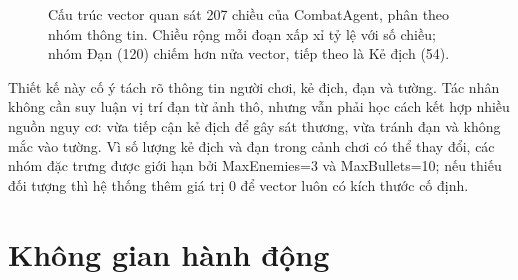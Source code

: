 \begin{figure}[H]
\centering
{}
\caption{Cấu trúc vector quan sát 207 chiều của CombatAgent, phân theo nhóm thông tin. Chiều rộng mỗi đoạn xấp xỉ tỷ lệ với số chiều; nhóm Đạn (120) chiếm hơn nửa vector, tiếp theo là Kẻ địch (54).}
\label{fig:obs_breakdown}
\end{figure}

Thiết kế này cố ý tách rõ thông tin người chơi, kẻ địch, đạn và tường. Tác nhân không cần suy luận vị trí đạn từ ảnh thô, nhưng vẫn phải học cách kết hợp nhiều nguồn nguy cơ: vừa tiếp cận kẻ địch để gây sát thương, vừa tránh đạn và không mắc vào tường. Vì số lượng kẻ địch và đạn trong cảnh chơi có thể thay đổi, các nhóm đặc trưng được giới hạn bởi MaxEnemies=3 và MaxBullets=10; nếu thiếu đối tượng thì hệ thống thêm giá trị 0 để vector luôn có kích thước cố định.

\section{Không gian hành động}

